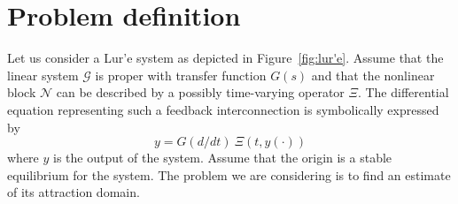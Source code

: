 \documentclass[letterpaper,10pt,twocolumn,journal,final]{IEEEtran}
\newcommand{\Csi}{\Xi}
\begin{document}
\section{Problem definition}\label{sec:probdef}
Let us consider a Lur'e system as depicted in Figure~\ref{fig:lur'e}.
Assume that the linear system $\mathcal{G}$ is proper with transfer function $G(s)$ and that the nonlinear block $\mathcal{N}$ can be described by a possibly time-varying operator $\Csi$. 
The differential equation representing such a feedback interconnection is symbolically expressed by
\begin{equation}\label{eq:symlur'e}
	y = G(d/dt)~\Csi(t, y(\cdot))
\end{equation}
where $y$ is the output of the system. Assume that the origin is a stable equilibrium for the system. The problem we are considering is to find an estimate of its attraction domain.
\end{document}
